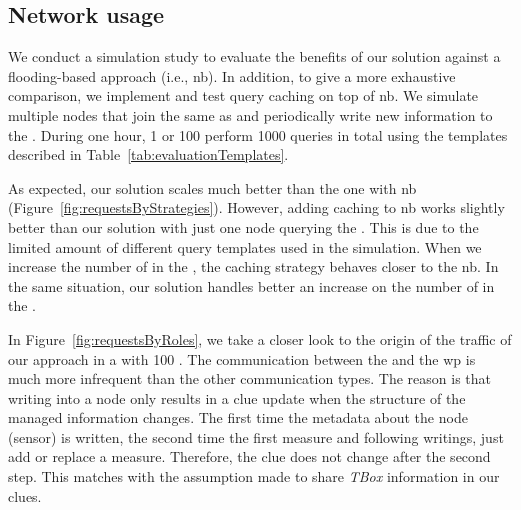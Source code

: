 


\subsection{Network usage} %
\label{sec:NetworkUsage}


We conduct a simulation study to evaluate the benefits of our solution against a flooding-based approach (i.e., \ac{nb}).
In addition, to give a more exhaustive comparison, we implement and test query caching on top of \ac{nb}.
We simulate multiple nodes that join the same \Space{} as \providers{} and periodically write new information to the \Space{}.
During one hour, 1 or 100 \consumers{} perform 1000 queries in total using the templates described in Table~\ref{tab:evaluationTemplates}.

As expected, our solution scales much better than the one with \ac{nb} (Figure~\ref{fig:requestsByStrategies}).
However, adding caching to \ac{nb} works slightly better than our solution with just one node querying the \Space{}.
This is due to the limited amount of different query templates used in the simulation.
When we increase the number of \consumers{} in the \Space{}, the caching strategy behaves closer to the \ac{nb}.
In the same situation, our solution handles better an increase on the number of \consumers{} in the \Space{}.




In Figure~\ref{fig:requestsByRoles}, we take a closer look to the origin of the traffic of our approach in a \Space{} with 100 \consumers{}.
The communication between the \providers{} and the \ac{wp} is much more infrequent than the other communication types.
The reason is that writing into a node only results in a clue update when the structure of the managed information changes.
The first time the metadata about the node (sensor) is written, the second time the first measure and following writings, just add or replace a measure.
Therefore, the clue does not change after the second step.
This matches with the assumption made to share \emph{TBox} information in our clues.

